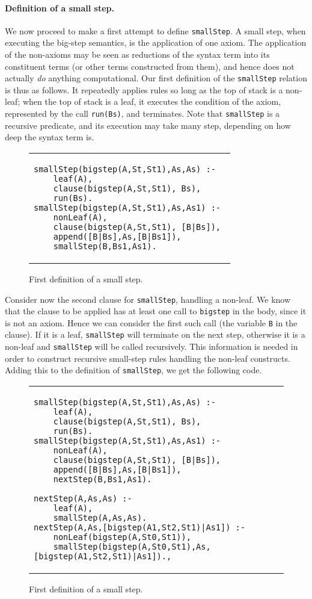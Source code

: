 \documentclass{llncs}
\begin{document}
\paragraph{Definition of a small step.} We now proceed to make a first attempt to define \texttt{smallStep}.
A small step, when executing the big-step semantics, is the application of one axiom.  
The application of the non-axioms may be seen as reductions of the syntax
term into its constituent terms (or other terms constructed from them), and hence does not actually \emph{do} anything computational.
Our first definition of the \texttt{smallStep} relation is thus as follows. It repeatedly applies rules so long as the top of stack is a non-leaf; when 
the top of stack is a leaf, it executes the condition of the axiom, represented by the call \texttt{run(Bs)}, and terminates.  
Note that \texttt{smallStep}
is a recursive predicate, and its execution may take many step, depending on how deep the syntax term is.

\begin{figure}
\begin{tabular}{l}
\begin{lstlisting}
smallStep(bigstep(A,St,St1),As,As) :- 
	leaf(A),
	clause(bigstep(A,St,St1), Bs),
	run(Bs).
smallStep(bigstep(A,St,St1),As,As1) :- 
	nonLeaf(A),
	clause(bigstep(A,St,St1), [B|Bs]),
	append([B|Bs],As,[B|Bs1]),
	smallStep(B,Bs1,As1).
\end{lstlisting}
\end{tabular}
\caption{First definition of a small step.}\label{fig:linear-smallstep}
\end{figure}

Consider now the second clause for \texttt{smallStep}, handling a non-leaf.  We know that the clause to be applied has at least one
call to \texttt{bigstep} in the body, since it is not an axiom. Hence we can consider the first such call (the variable \texttt{B} in the clause).
If it is a leaf, \texttt{smallStep} will terminate on the next step, otherwise it is a non-leaf and \texttt{smallStep} will be called recursively.
This information is needed in order to construct recursive small-step rules handling the non-leaf constructs. Adding this to the definition of
\texttt{smallStep}, we get the following code.

\begin{figure}
\begin{tabular}{l}
\begin{lstlisting}
smallStep(bigstep(A,St,St1),As,As) :- 
	leaf(A),
	clause(bigstep(A,St,St1), Bs),
	run(Bs).
smallStep(bigstep(A,St,St1),As,As1) :- 
	nonLeaf(A),
	clause(bigstep(A,St,St1), [B|Bs]),
	append([B|Bs],As,[B|Bs1]),
	nextStep(B,Bs1,As1).
	
nextStep(A,As,As) :-
	leaf(A),
	smallStep(A,As,As).
nextStep(A,As,[bigstep(A1,St2,St1)|As1]) :-
	nonLeaf(bigstep(A,St0,St1)),
	smallStep(bigstep(A,St0,St1),As,[bigstep(A1,St2,St1)|As1]).,
\end{lstlisting}
\end{tabular}
\caption{First definition of a small step.}\label{fig:linear-smallstep}
\end{figure}



%

\end{document}
